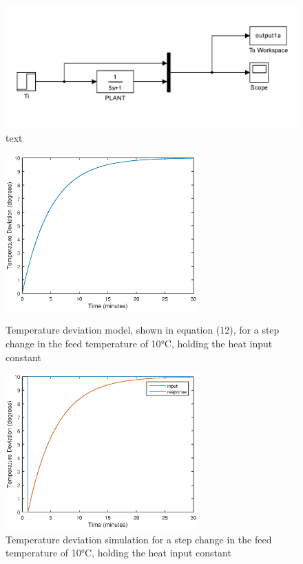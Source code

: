 \documentclass{article}
\begin{document}
\begin{figure}[h]
\centering
\includegraphics[scale=0.2]{block_1a}
\caption{text}
\end{figure}

\begin{figure}[h]
\begin{minipage}{0.45\textwidth}
\centering
\includegraphics[height=6cm]{1a_mod}
\caption{Temperature deviation model, shown in equation (12), for a step change in the feed temperature of 10$\si{\degreeCelsius}$, holding the heat input constant}
\end{minipage}
\hspace{1cm}
\begin{minipage}{0.45\textwidth}
\centering
\includegraphics[height=6cm]{1a_sim}
\caption{Temperature deviation simulation for a step change in the feed temperature of 10$\si{\degreeCelsius}$, holding the heat input constant}
\end{minipage}
\end{figure}
\end{document}
